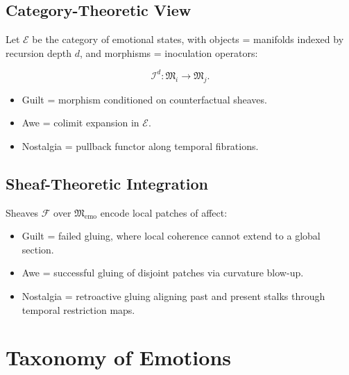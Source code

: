 \documentclass{article}
\theoremstyle{definition}
\begin{document}
\subsection{Category-Theoretic View}

Let $\mathcal{E}$ be the category of emotional states, 
with objects = manifolds indexed by recursion depth $d$, 
and morphisms = inoculation operators:

\[
\mathcal{I}^d : \mathfrak{M}_i \to \mathfrak{M}_j.
\]

\begin{itemize}
  \item Guilt = morphism conditioned on counterfactual sheaves.  
  \item Awe = colimit expansion in $\mathcal{E}$.  
  \item Nostalgia = pullback functor along temporal fibrations.  
\end{itemize}

\subsection{Sheaf-Theoretic Integration}

Sheaves $\mathcal{F}$ over $\mathfrak{M}_{\text{emo}}$ encode 
local patches of affect:

\begin{itemize}
  \item Guilt = failed gluing, where local coherence cannot extend 
        to a global section.  
  \item Awe = successful gluing of disjoint patches via curvature blow-up.  
  \item Nostalgia = retroactive gluing aligning past and present stalks 
        through temporal restriction maps.  
\end{itemize}

\section{Taxonomy of Emotions}
\end{document}
